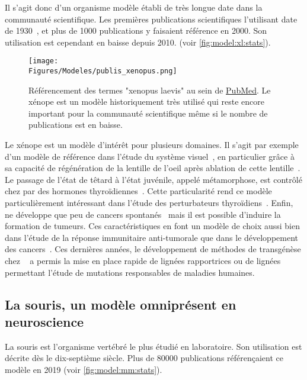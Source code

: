 \documentclass[\main/main.tex]{subfiles}
\begin{document}
%
Il s'agit donc d'un organisme modèle établi de très longue date dans la communauté scientifique.
%
Les premières publications scientifiques l'utilisant date de 1930~\cite{edgeworth_1930},
et plus de 1000 publications y faisaient référence en 2000.
%
Son utilisation est cependant en baisse depuis 2010. (voir \autoref{fig:model:xl:stats}).
%

\begin{figure}[h!]{\textwidth} 
    \centering
       \centering \texttt{[image: \\Figures/Modeles/publis\_xenopus.png]}
       \caption{
            \label{fig:model:xl:stats}Référencement des termes "xenopus laevis" au sein de \href{https://pubmed.ncbi.nlm.nih.gov/?term=xenopus+laevis&sort=pubdate}{PubMed}.\newline
            Le xénope est un modèle historiquement très utilisé qui reste encore important pour la communauté scientifique même si le nombre de publications est en baisse.
            }
\end{figure}

%
Le xénope est un modèle d'intérêt pour plusieurs domaines.
%
Il s'agit par exemple d'un modèle de référence dans l'étude du système visuel~\cite{viet_2020,Rahman_2020,kha_2020},
en particulier grâce à sa capacité de régénération de la lentille de l'oeil après ablation de cette lentille~\cite{henry_2019}.
%
Le passage de l'état de têtard à l'état juvénile, appelé métamorphose, est contrôlé chez \xl{} par des hormones thyroïdiennes~\cite{brown_1996,furlow_2006}.
%
Cette particularité rend ce modèle particulièrement intéressant dans l'étude des perturbateurs thyroïdiens~\cite{li_2019,li_2019a,Couderq_2020}.
%
Enfin, \xl{} ne développe que peu de cancers spontanés~\cite{ruben_2007} mais il est possible d'induire la formation de tumeurs. Ces caractéristiques en font un modèle de choix aussi bien dans l'étude de la réponse immunitaire anti-tumorale que dans le développement des cancers~\cite{hardwick_2015}.
%
 Ces dernières années, le développement de méthodes de transgénèse chez \xl{}~\cite{tandon_2017} a permis la mise en place rapide de lignées rapportrices ou de lignées permettant l'étude de mutations responsables de maladies humaines.

    \subsection{La souris, un modèle omniprésent en neuroscience}

La souris est l'organisme vertébré le plus étudié en laboratoire.
%
Son utilisation  est décrite dès le dix-septième siècle.
%
Plus de 80000 publications référençaient ce modèle en 2019 (voir \autoref{fig:model:mm:stats}).
\end{document}
